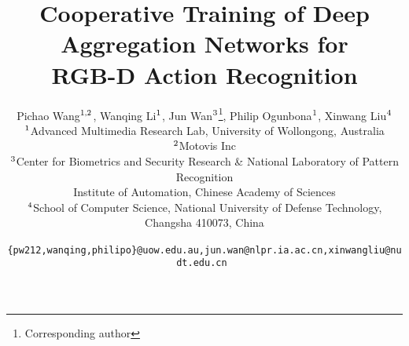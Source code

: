 \documentclass[letterpaper]{article} %
\begin{document}
%
\title{Cooperative Training of Deep Aggregation Networks for \\RGB-D Action
Recognition}
\author{Pichao Wang$^{\rm 1,2}$, Wanqing Li$^{\rm 1}$, Jun Wan$^{\rm 3}$\thanks{Corresponding author}, Philip Ogunbona$^{\rm 1}$, Xinwang Liu$^{\rm 4}$ \\
$^{\rm 1}$Advanced Multimedia Research Lab, University of Wollongong, Australia\\
$^{\rm 2}$Motovis Inc\\
$^{\rm 3}$Center for Biometrics and Security Research \& National Laboratory of Pattern Recognition\\ Institute of Automation, Chinese Academy of Sciences \\
$^{\rm 4}$School of Computer Science, National University of Defense Technology, Changsha 410073, China \\
{\tt\footnotesize %
\{pw212,wanqing,philipo\}@uow.edu.au,jun.wan@nlpr.ia.ac.cn,xinwangliu@nudt.edu.cn
}\\
}
\maketitle
\end{document}
